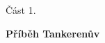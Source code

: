 
    \begin{center}
        \vspace*{1cm}
        \Huge
        Část 1.
        \vspace{8cm}

        
        {\fontsize{50}{50}\selectfont \textbf{Příběh Tankerenův}}
            
        \vspace{1.5cm}
        \thispagestyle{empty}
            

            
    \end{center}
